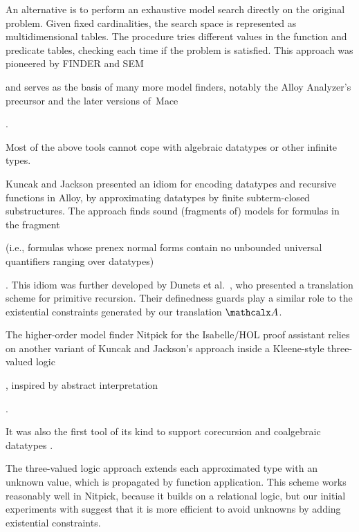 An alternative is to perform
an exhaustive model search directly on the original problem. Given fixed
cardinalities, the search space is represented as multidimensional
tables. The procedure tries different values in the function and predicate
tables, checking each time if the problem is satisfied.
This approach was pioneered by FINDER
\cite{slaney-1994} and SEM \cite{zhang-zhang-1995}\begin{longv} and serves as
the basis of many more model finders, notably the Alloy Analyzer's precursor
\cite{jackson-1996} and the later versions of~Mace
\cite{mccune-prover9-mace4}\end{longv}.

\begin{longv}
Most of the above tools cannot cope with algebraic datatypes or other infinite
types. \end{longv}%
Kuncak and Jackson \cite{kuncak-jackson-2005} presented an idiom for
encoding datatypes and recursive functions in Alloy, by approximating datatypes
by finite subterm-closed substructures. The approach finds sound (fragments
of) models for formulas in the  fragment
\begin{longv}(i.e., formulas whose prenex normal forms contain no unbounded universal
quantifiers ranging over datatypes)\end{longv}. This idiom was further developed by Dunets
et al.\ \cite{dunets-et-al-2010}, who presented a translation scheme
for primitive recursion. Their definedness guards play a similar role to the
existential constraints generated by our translation $\conv$.

The higher-order model finder Nitpick \cite{blanchette-nipkow-2010}
for the Isabelle/HOL proof assistant
relies on another variant of Kuncak and Jackson's approach inside a
Kleene-style three-valued logic\begin{longv}, inspired by abstract interpretation\end{longv}.
\begin{longv}It was also the first tool of its kind to support corecursion and
coalgebraic datatypes \cite{blanchette-2013-relational}.\end{longv}
The three-valued logic approach extends each
approximated type with an unknown value, which is propagated by function
application. This scheme works reasonably well in Nitpick, because it builds
on a relational logic, but our initial experiments with \cvc suggest
that it is more efficient to avoid unknowns by adding existential
constraints.

